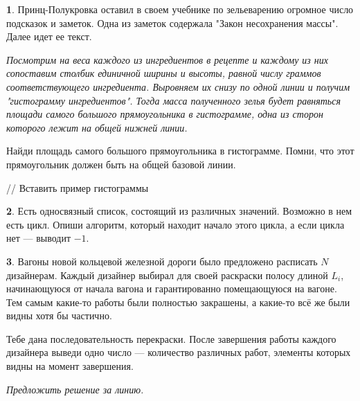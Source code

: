 \documentclass[14pt, a4paper]{extarticle}
\theoremstyle{definition}
\newtheorem{problem}{}
\theoremstyle{definition}
\theoremstyle{remark}
\numberwithin{equation}{section}
\begin{document}
\begin{problem}
    Принц-Полукровка оставил в своем учебнике по зельеварению 
    огромное число подсказок и заметок. Одна из заметок содержала 
    "Закон несохранения массы". Далее идет ее текст.

    \textit{Посмотрим на веса каждого из ингредиентов в рецепте и 
    каждому из них сопоставим столбик единичной ширины и высоты, 
    равной числу граммов соответствующего ингредиента. 
    Выровняем их снизу по одной линии и получим "гистограмму 
    ингредиентов". Тогда масса полученного зелья будет равняться 
    площади самого большого прямоугольника в гистограмме, одна 
    из сторон которого лежит на общей нижней линии.}

    Найди площадь самого большого прямоугольника в гистограмме. 
    Помни, что этот прямоугольник должен быть на общей базовой линии.

    // Вставить пример гистограммы
\end{problem}

\begin{problem}
    Есть односвязный список, состоящий из различных значений. 
    Возможно в нем есть цикл. Опиши алгоритм, который находит
    начало этого цикла, а если цикла нет --- выводит $-1$.

    \begin{figure}[h]
        \centering

    \end{figure}
\end{problem}

\begin{problem}
    Вагоны новой кольцевой железной дороги было предложено расписать 
    $N$ дизайнерам. Каждый дизайнер выбирал для своей раскраски полосу 
    длиной $L_i$, начинающуюся от начала вагона и гарантированно 
    помещающуюся на вагоне. Тем самым какие-то работы были полностью 
    закрашены, а какие-то всё же были видны хотя бы частично.

    Тебе дана последовательность перекраски. После завершения работы 
    каждого дизайнера выведи одно число — количество различных работ, 
    элементы которых видны на момент завершения.

    \textit{Предложить решение за линию.}
\end{problem}
\end{document}

